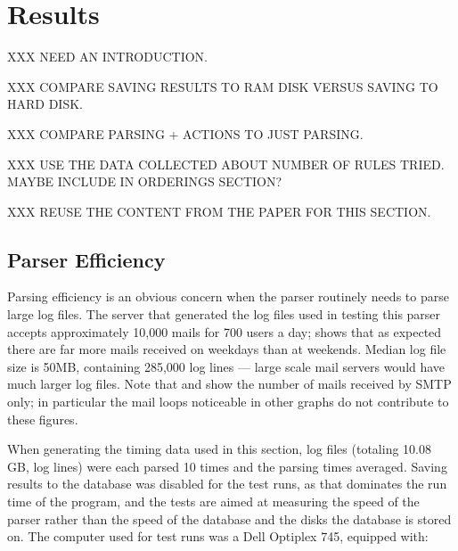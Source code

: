 \newpage{} %
\chapter{Results}

XXX NEED AN INTRODUCTION\@.

XXX COMPARE SAVING RESULTS TO RAM DISK VERSUS SAVING TO HARD DISK\@.

XXX COMPARE PARSING + ACTIONS TO JUST PARSING\@.

XXX USE THE DATA COLLECTED ABOUT NUMBER OF RULES TRIED\@.  MAYBE INCLUDE IN
ORDERINGS SECTION\@?

XXX REUSE THE CONTENT FROM THE PAPER FOR THIS SECTION\@.

\section{Parser Efficiency}

\label{parser efficiency}

Parsing efficiency is an obvious concern when the parser routinely needs to
parse large log files.  The server that generated the log files used in
testing this parser accepts approximately 10,000 mails for 700 users a day;
 shows that as expected there are far more
mails received on weekdays than at weekends.   Median log file size is
50MB, containing 285,000 log lines --- large scale mail servers would have
much larger log files.  Note that  and
 show the number of
mails received by \gls{SMTP} only; in particular the mail loops noticeable
in other graphs do not contribute to these figures.



When generating the timing data used in this section, \numberOFlogFILES{}
log files (totaling 10.08 GB, \numberOFlogLINEShuman{} log lines) were each
parsed 10 times and the parsing times averaged.  Saving results to the
database was disabled for the test runs, as that dominates the run time of
the program, and the tests are aimed at measuring the speed of the parser
rather than the speed of the database and the disks the database is stored
on.  The computer used for test runs was a Dell Optiplex 745, equipped
with: 

